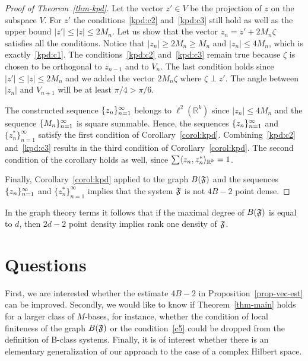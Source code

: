 \documentclass[12pt,oneside,a4paper]{amsart}
\begin{document}
\begin{proof}[Proof of Theorem~\ref{thm-kpd}]
        Let the vector $z' \in V$ be the projection of $z$ on the subspace $V$.
        For $z'$ the conditions~\ref{kpd:c2} and~\ref{kpd:c3} still hold as well as the upper bound
          $\lvert z'\rvert \leq \lvert z\rvert \leq 2 M_n$.
        Let us show that the vector $z_n = z' + 2 M_n \zeta$ satisfies all the conditions.
        Notice that $\lvert z_n \rvert \geq 2 M_n \geq M_n$ and $\lvert z_n \rvert \leq 4 M_n$,
          which is exactly~\ref{kpd:c1}.
        The conditions~\ref{kpd:c2} and~\ref{kpd:c3} remain true because $\zeta$ is chosen to be orthogonal to $z_{n - 1}$ and to $V_n$.
        The last condition holds since $\lvert z'\rvert \leq \lvert z \rvert \leq 2 M_n$ and we added the vector $2M_n \zeta$
          where $\zeta \perp z'$.
        The angle between $\lvert z_n\rvert$ and $V_{n+1}$ will be at least $\pi / 4 > \pi / 6$.
        \smallskip

        The constructed sequence $\{{z}_n\}_{n=1}^\infty$ belongs to $\ell^2({\mathbb{R}^k})$
          since $\lvert z_n \rvert \leq 4M_n$ and the sequence $\{{M}_n\}_{n=1}^\infty$ is square summable.
        Hence, the sequences $\{{z}_n\}_{n=1}^\infty$ and $\{z_n^*\}_{n=1}^\infty$ satisfy the first condition of Corollary~\ref{corol:kpd}.
        Combining~\ref{kpd:c2} and~\ref{kpd:c3} results in the third condition of Corollary~\ref{corol:kpd}.
        The second condition of the corollary holds as well, since $\sum \langle z_n, z^*_n \rangle_{\mathbb{R}^k} = 1$.

        Finally, Corollary~\ref{corol:kpd} applied to the graph $B(\mathfrak{F})$ and the sequences $\{{z}_n\}_{n=1}^\infty$ and $\{z_n^*\}_{n=1}^\infty$ implies that the system $\mathfrak{F}$ is not $4B - 2$ point dense.
      \end{proof}
      \begin{remark*}
        In the graph theory terms it follows that if the maximal degree of $B(\mathfrak{F})$ is equal to $d$,
          then $2d - 2$ point density implies rank one density of $\mathfrak{F}$.
      \end{remark*}
  \bigskip
  \section{Questions}
    First, we are interested whether the estimate $4B - 2$ in Proposition~\eqref{prop-vec-est} can be improved.
    Secondly, we would like to know if Theorem~\ref{thm-main} holds for a larger class of $M$-bases, for instance, whether the condition of
      local finiteness of the graph $B(\mathfrak{F})$ or the condition~\ref{c5} could be dropped from the definition of B-class systems.
    Finally, it is of interest whether there is an elementary generalization of our approach to the case of a complex Hilbert space.
\end{document}
